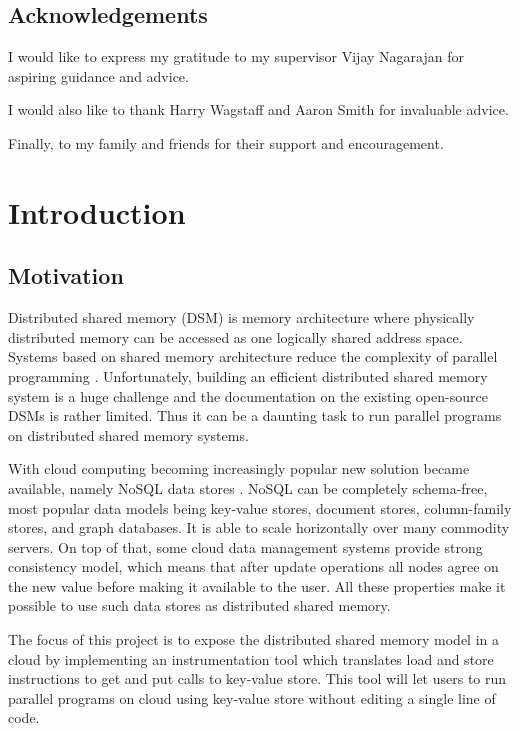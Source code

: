 \documentclass[bsc,frontabs,twoside,singlespacing,parskip,deptreport]{infthesis}     %
\begin{document}
\section*{Acknowledgements}

I would like to express my gratitude to my supervisor Vijay Nagarajan for aspiring guidance and advice.

I would also like to thank Harry Wagstaff and Aaron Smith for invaluable advice.

Finally, to my family and friends for their support and encouragement.

\tableofcontents



\chapter{Introduction}

\section{Motivation}

Distributed shared memory (DSM) is memory architecture where physically distributed memory can be accessed as one logically shared address space. Systems based on shared memory architecture reduce the complexity of parallel programming \citep{vodca}. Unfortunately, building an efficient distributed shared memory system is a huge challenge and the documentation on the existing open-source DSMs is rather limited. Thus it can be a daunting task to run parallel programs on distributed shared memory systems.

With cloud computing becoming increasingly popular new solution became available, namely NoSQL data stores \citep{nosql-data-stores}. NoSQL can be completely schema-free, most popular data models being key-value stores, document stores, column-family stores, and graph databases. It is able to scale horizontally over many commodity servers. On top of that, some cloud data management systems provide strong consistency model, which means that after update operations all nodes agree on the new value before making it available to the user. All these properties make it possible to use such data stores as distributed shared memory.

The focus of this project is to expose the distributed shared memory model in a cloud by implementing an instrumentation tool which translates load and store instructions to get and put calls to key-value store. This tool will let users to run parallel programs on cloud using key-value store without editing a single line of code.
\end{document}

